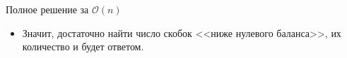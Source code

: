 \begin{frame}{Полное решение за $\mathcal{O}(n)$}
  \begin{itemize}
  \item Значит, достаточно найти число скобок <<ниже нулевого баланса>>, их количество и будет ответом.
  \end{itemize}
\end{frame} 
